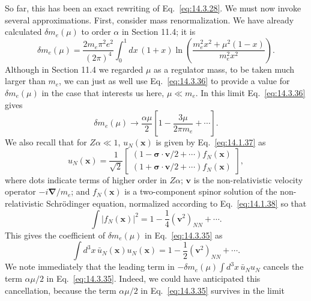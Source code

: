 So far, this has been an exact rewriting of Eq.~\eqref{eq:14.3.28}. We must
now invoke several approximations. First, consider mass renormalization. We
have already calculated $\delta m_e(\mu)$ to order $\alpha$ in Section 11.4;
it is
\begin{equation}
\delta m_e(\mu)=\frac{2m_e\pi^2e^2}{(2\pi)^4}
\int_0^1dx\,(1+x)\ln\left(
\frac{m_e^2x^2+\mu^2(1-x)}{m_e^2x^2}\right).
\tag{14.3.36}\label{eq:14.3.36}
\end{equation}
Although in Section 11.4 we regarded $\mu$ as a regulator mass, to be taken
much larger than $m_e$, we can just as well use Eq.~\eqref{eq:14.3.36} to
provide a value for $\delta m_e(\mu)$ in the case that interests us here,
$\mu\ll m_e$. In this limit Eq.~\eqref{eq:14.3.36} gives
\begin{equation}
\delta m_e(\mu)\longrightarrow\frac{\alpha\mu}{2}
\left[1-\frac{3\mu}{2\pi m_e}+\cdots\right].
\tag{14.3.37}\label{eq:14.3.37}
\end{equation}
We also recall that for $Z\alpha\ll1$, $u_N(\mathbf x)$ is given by
Eq.~\eqref{eq:14.1.37} as
\begin{equation}
u_N(\mathbf x)=\frac{1}{\sqrt2}
\begin{bmatrix}
(1-\boldsymbol\sigma\cdot\mathbf v/2+\cdots)f_N(\mathbf x)\\
(1+\boldsymbol\sigma\cdot\mathbf v/2+\cdots)f_N(\mathbf x)
\end{bmatrix},
\tag{14.3.38}\label{eq:14.3.38}
\end{equation}
where dots indicate terms of higher order in $Z\alpha$; $\mathbf v$ is the
non-relativistic velocity operator $-i\boldsymbol\nabla/m_e$; and
$f_N(\mathbf x)$ is a two-component spinor solution of the non-relativistic
Schrödinger equation, normalized according to Eq.~\eqref{eq:14.1.38} so that
\begin{equation}
\int|f_N(\mathbf x)|^2=1-\frac14(\mathbf v^2)_{NN}+\cdots.
\tag{14.3.39}\label{eq:14.3.39}
\end{equation}
This gives the coefficient of $\delta m_e(\mu)$ in Eq.~\eqref{eq:14.3.35} as
\begin{equation}
\int d^3x\,\bar u_N(\mathbf x)u_N(\mathbf x)
=1-\frac12(\mathbf v^2)_{NN}+\cdots.
\tag{14.3.40}\label{eq:14.3.40}
\end{equation}
We note immediately that the leading term in
$-\delta m_e(\mu)\int d^3x\,\bar u_Nu_N$ cancels the term $\alpha\mu/2$ in
Eq.~\eqref{eq:14.3.35}. Indeed, we could have anticipated this cancellation,
because the term $\alpha\mu/2$ in Eq.~\eqref{eq:14.3.35} survives in the limit

